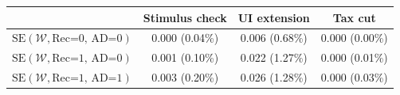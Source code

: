 \begin{tabular}{@{}lccc@{}}
\toprule
                          & Stimulus check      & UI extension    & Tax cut    \\  \midrule
$\mathrm{SE}(\mathcal{W}, \text{Rec=0, AD=0})$ & 0.000 (0.04\%)  & 0.006 (0.68\%)  & 0.000 (0.00\%)     \\
$\mathrm{SE}(\mathcal{W}, \text{Rec=1, AD=0})$ & 0.001 (0.10\%)  & 0.022 (1.27\%)  & 0.000 (0.01\%)     \\
$\mathrm{SE}(\mathcal{W}, \text{Rec=1, AD=1})$ & 0.003 (0.20\%)  & 0.026 (1.28\%)  & 0.000 (0.03\%)     \\ \bottomrule
\end{tabular}

